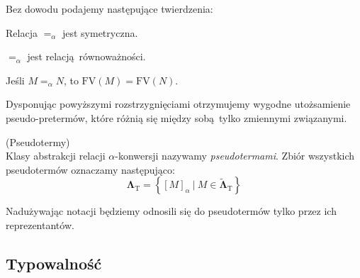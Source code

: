 \noindent Bez dowodu podajemy następujące twierdzenia:
    \begin{fakt}
      Relacja \(=_{\alpha}\) jest symetryczna.
    \end{fakt}
    \begin{fakt}
      \(=_{\alpha}\) jest relacją równoważności.
    \end{fakt}
    \begin{fakt}
      Jeśli \(M=_\alpha N\), to \(\mathrm{FV}(M)=\mathrm{FV}(N)\).
    \end{fakt}

Dysponując powyższymi rozstrzygnięciami otrzymujemy wygodne utożsamienie pseudo-pretermów,
które różnią się między sobą tylko zmiennymi związanymi.

\begin{definicja}(Pseudotermy)\\
  Klasy abstrakcji relacji \(\alpha\)-konwersji nazywamy \emph{pseudotermami}. Zbiór wszystkich pseudotermów oznaczamy następująco:
\[
  \mathbf{\Lambda}_{\mathrm{T}}=\left\{[M]_\alpha\:|\: M\in\mathbf{\tilde{\Lambda}}_\mathrm{T}\right\}
\]
\end{definicja}
Nadużywając notacji będziemy odnosili się do pseudotermów tylko przez ich reprezentantów.
\subsection{Typowalność} 
    

